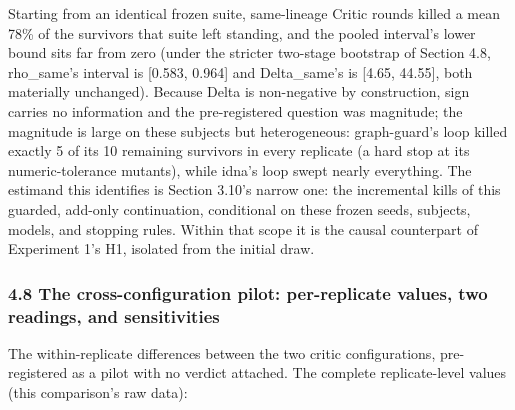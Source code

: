 \documentclass[
  11pt,
]{article}
\begin{document}
Starting from an identical frozen suite, same-lineage Critic rounds
killed a mean 78\% of the survivors that suite left standing, and the
pooled interval's lower bound sits far from zero (under the stricter
two-stage bootstrap of Section 4.8, rho\_same's interval is {[}0.583,
0.964{]} and Delta\_same's is {[}4.65, 44.55{]}, both materially
unchanged). Because Delta is non-negative by construction, sign carries
no information and the pre-registered question was magnitude; the
magnitude is large on these subjects but heterogeneous: graph-guard's
loop killed exactly 5 of its 10 remaining survivors in every replicate
(a hard stop at its numeric-tolerance mutants), while idna's loop swept
nearly everything. The estimand this identifies is Section 3.10's narrow
one: the incremental kills of this guarded, add-only continuation,
conditional on these frozen seeds, subjects, models, and stopping rules.
Within that scope it is the causal counterpart of Experiment 1's H1,
isolated from the initial draw.

\subsubsection{4.8 The cross-configuration pilot: per-replicate values,
two readings, and
sensitivities}\label{the-cross-configuration-pilot-per-replicate-values-two-readings-and-sensitivities}

The within-replicate differences between the two critic configurations,
pre-registered as a pilot with no verdict attached. The complete
replicate-level values (this comparison's raw data):
\end{document}
